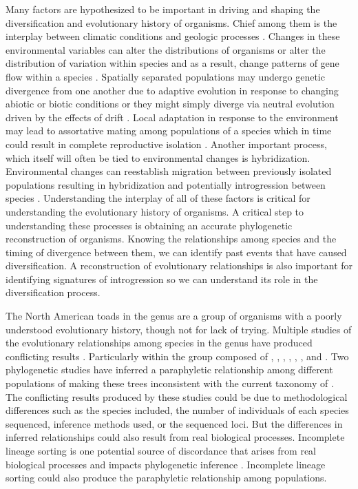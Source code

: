 Many factors are hypothesized to be important in driving and shaping the 
diversification and evolutionary history of organisms. 
Chief among them is the interplay between climatic conditions and geologic processes
\parencite{hua2013}.
Changes in these environmental variables can alter the distributions of organisms
or alter the distribution of variation within species and as a result,
change patterns of gene flow within a species \parencite{coyne2004}.
Spatially separated populations may undergo genetic divergence from one another due 
to adaptive evolution in response to changing abiotic or biotic conditions 
or they might simply diverge via neutral evolution driven by the effects of drift \parencite{coyne2004}.
Local adaptation in response to the environment may lead to assortative mating 
among populations of a species which in time could result in complete reproductive
isolation \parencite{mallet2008}.  
Another important process, which itself will often be tied to environmental changes
is hybridization. 
Environmental changes can reestablish migration between previously isolated 
populations resulting in hybridization and potentially introgression between species 
\parencite{abbott2013}.
Understanding the interplay of all of these factors is critical for understanding
the evolutionary history of organisms.
A critical step to understanding these processes is obtaining an accurate 
phylogenetic reconstruction of organisms. 
Knowing the relationships among species and the timing of divergence between them,
we can identify past events that have caused diversification.
A reconstruction of evolutionary relationships is also important for identifying
signatures of introgression so we can understand its role in the diversification
process. 

The North American toads in the genus \anaxyrus are a group of organisms with a 
poorly understood evolutionary history, though not for lack of trying.
Multiple studies of the evolutionary relationships among species in the genus have produced
conflicting results \parencite{fontenot2011,graybeal1997,masta2002,pramuk2007,pyron2011,portik2023}.
Particularly within the \americanus group composed of \amer, \baxteri, \fowl, 
\hemiophrys, \houstonensis, \terr, and \wood.
Two phylogenetic studies have inferred a paraphyletic relationship among different 
populations of \fowl making these trees inconsistent with the current taxonomy
of \anaxyrus \parencite{fontenot2011,masta2002}.
The conflicting results produced by these studies could be due to methodological differences such as
the species included, the number of individuals of each species sequenced, inference 
methods used, or the sequenced loci. 
But the differences in inferred relationships could also result from real biological processes. 
Incomplete lineage sorting is one potential source of discordance
that arises from real biological processes and 
impacts phylogenetic inference \parencite{kubatko2007}. 
Incomplete lineage sorting could also produce the paraphyletic relationship among
\fowl populations. 


